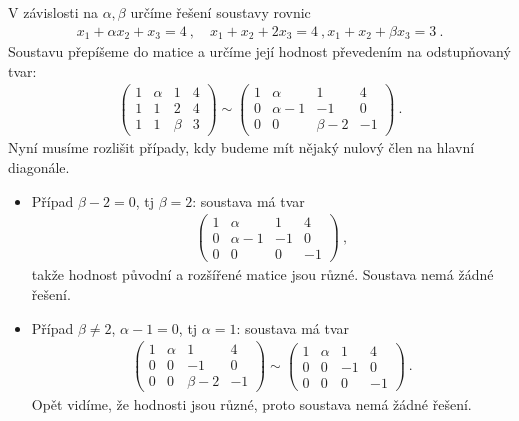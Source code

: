 \begin{example}
    V závislosti na $\alpha, \beta$ určíme řešení soustavy rovnic \begin{align}
        x_1 + \alpha x_2 + x_3 = 4 \:, \quad x_1 + x_2 + 2 x_3 = 4 \:, x_1 + x_2 + \beta x_3 = 3 \:.
    \end{align}
    Soustavu přepíšeme do matice a určíme její hodnost převedením na odstupňovaný tvar:
    \begin{align}
        \left(\begin{array}{rrr|r}
            1 & \alpha & 1 & 4 \\ 1 & 1 & 2 & 4 \\ 1 & 1 & \beta & 3 
        \end{array}\right) 
        \sim
        \left(\begin{array}{rrr|r}
            1 & \alpha & 1 & 4 \\ 0 & \alpha - 1 & -1 & 0 \\ 0 & 0 & \beta - 2 & -1 
        \end{array}\right)
        \:.
    \end{align}
    Nyní musíme rozlišit případy, kdy budeme mít nějaký nulový člen na hlavní diagonále.

    \begin{itemize}
        \item Případ $\beta - 2 = 0$, tj $\beta = 2$: soustava má tvar
        \begin{align}
            \left(\begin{array}{rrr|r}
                1 & \alpha & 1 & 4 \\ 0 & \alpha - 1 & -1 & 0 \\ 0 & 0 & 0 & -1 
            \end{array}\right)
            \:,
        \end{align}
        takže hodnost původní a rozšířené matice jsou různé. Soustava nemá žádné řešení.

        \item Případ $\beta \neq 2$, $\alpha - 1 =0$, tj $\alpha = 1$: soustava má tvar
        \begin{align}
            \left(\begin{array}{rrr|r}
                1 & \alpha & 1 & 4 \\ 0 & 0 & -1 & 0 \\ 0 & 0 & \beta - 2 & -1 
            \end{array}\right)
            \sim
            \left(\begin{array}{rrr|r}
                1 & \alpha & 1 & 4 \\ 0 & 0 & -1 & 0 \\ 0 & 0 & 0 & -1 
            \end{array}\right) \:.
        \end{align}
        Opět vidíme, že hodnosti jsou různé, proto soustava nemá žádné řešení.
        

\end{itemize}
\end{example}
